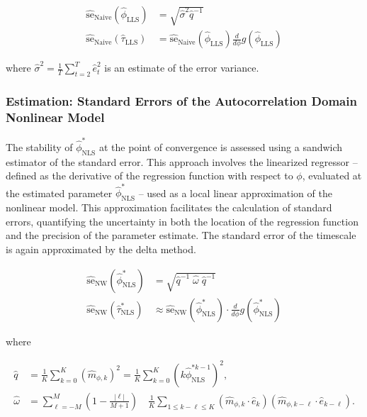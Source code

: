 \documentclass[main.tex]{subfiles}
\begin{document}
\begin{align} 
    \widehat{\text{se}}_\text{Naive}(\hat\phi_{\scriptscriptstyle\text{LLS}}) &= \sqrt{\hat\sigma^2 \hat q^{-1}}\\
    \widehat{\text{se}}_\text{Naive}(\hat\tau_{\scriptscriptstyle\text{LLS}}) &= \widehat{\text{se}}_{\text{Naive}}(\hat\phi_{\scriptscriptstyle\text{LLS}}) \frac{d}{d\phi} g(\hat\phi_{\scriptscriptstyle\text{LLS}})
\end{align}

\noindent where $\hat\sigma^2 = \frac{1}{T} \sum_{t=2}^T \hat e_t^2$ is an estimate of the error variance.

\subsubsection{Estimation: Standard Errors of the Autocorrelation Domain Nonlinear Model}
The stability of $\hat\phi^*_{\scriptscriptstyle\text{NLS}}$ at the point of convergence is assessed using a sandwich estimator of the standard error. This approach involves the linearized regressor -- defined as the derivative of the regression function with respect to $\phi$, evaluated at the estimated parameter $\hat \phi^*_{\scriptscriptstyle\text{NLS}}$ -- used as a local linear approximation of the nonlinear model. This approximation facilitates the calculation of standard errors, quantifying the uncertainty in both the location of the regression function and the precision of the parameter estimate. The standard error of the timescale is again approximated by the delta method.

\begin{align}
\widehat{\text{se}}_{\text{NW}}(\hat\phi^*_{\scriptscriptstyle\text{NLS}}) &= \sqrt{\hat q^{-1}\;\hat\omega\; \hat q^{-1}}\\
\widehat{\text{se}}_{\text{NW}}(\hat\tau^*_{\scriptscriptstyle\text{NLS}}) &\approx \widehat{\text{se}}_{\text{NW}}(\hat\phi^*_{\scriptscriptstyle\text{NLS}}) \cdot \frac{d}{d\phi} g(\hat\phi^*_{\scriptscriptstyle\text{NLS}})
\end{align}

\noindent where

\begin{align*}
    \hat q &= \frac{1}{K} \sum_{k=0}^K (\hat m_{\phi,k})^2 = \frac{1}{K} \sum_{k=0}^K (k \hat\phi_{\scriptscriptstyle\text{NLS}}^{*k-1})^2,\\
    \hat \omega &= \sum_{\ell=-M}^M (1 - \frac{|\ell|}{M+1}) \quad \frac{1}{K} \sum_{1 \le k - \ell \le K} (\hat m_{\phi, k} \cdot \hat e_k) (\hat m_{\phi, k-\ell} \cdot \hat e_{k-\ell}).
\end{align*}
\end{document}
